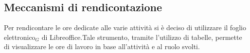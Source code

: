 \subsection{Meccanismi di rendicontazione}
Per rendicontare le ore dedicate alle varie attività si è deciso di utilizzare il foglio elettronico$_G$ di Libreoffice.Tale strumento, tramite l'utilizzo di tabelle, permette di visualizzare le ore di lavoro in base all'attività e al ruolo svolti.

\newpage
